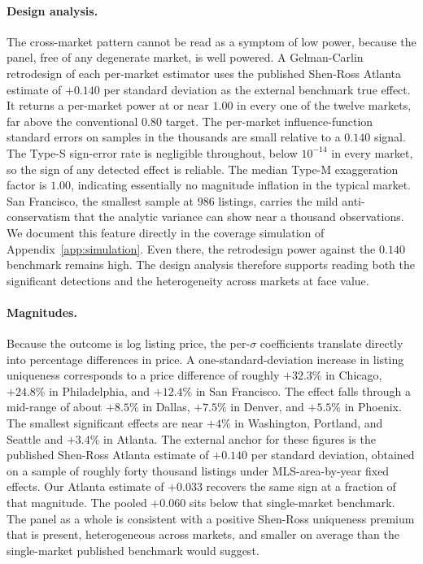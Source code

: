 \paragraph{Design analysis.} The cross-market pattern cannot be read as
a symptom of low power, because the panel, free of any degenerate market, is well powered. A Gelman-Carlin
\citep{gelman2014beyond} retrodesign of each per-market estimator uses the
published Shen-Ross Atlanta estimate of $+0.140$ per standard deviation as
the external benchmark true effect. It returns a per-market power at or near $1.00$
in every one of the twelve markets, far above the conventional $0.80$ target.
The per-market influence-function standard errors on samples in the
thousands are small relative to a $0.140$ signal. The Type-S sign-error rate is
negligible throughout, below $10^{-14}$ in every market, so the sign of any
detected effect is reliable. The median Type-M exaggeration factor is $1.00$,
indicating essentially no magnitude inflation in the typical market. San
Francisco, the smallest sample at $986$ listings, carries the mild
anti-conservatism that the analytic variance can show near a thousand
observations. We document this feature directly in the coverage simulation of
Appendix~\ref{app:simulation}. Even there, the retrodesign power against the
$0.140$ benchmark remains high. The design analysis therefore supports reading
both the significant detections and the heterogeneity across markets at face
value.

\paragraph{Magnitudes.} Because the outcome is log listing price, the per-$\sigma$
coefficients translate directly into percentage differences in price. A
one-standard-deviation increase in listing uniqueness corresponds to a price
difference of roughly $+32.3\%$ in Chicago, $+24.8\%$ in Philadelphia, and
$+12.4\%$ in San Francisco. The effect falls through a mid-range of about $+8.5\%$ in
Dallas, $+7.5\%$ in Denver, and $+5.5\%$ in Phoenix. The smallest significant
effects are near $+4\%$ in Washington, Portland, and Seattle and $+3.4\%$ in Atlanta.
The external anchor for these figures is the published Shen-Ross Atlanta
estimate of $+0.140$ per standard deviation, obtained on a sample of roughly
forty thousand listings under MLS-area-by-year fixed effects. Our Atlanta
estimate of $+0.033$ recovers the same sign at a fraction of that
magnitude. The pooled $+0.060$ sits below that single-market benchmark. The
panel as a whole is consistent with a positive Shen-Ross uniqueness premium
that is present, heterogeneous across markets, and smaller on average than the
single-market published benchmark would suggest.

